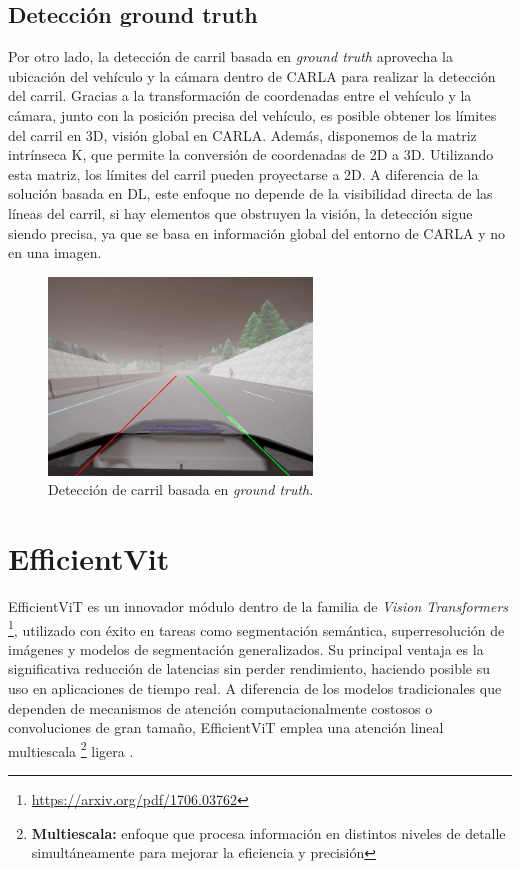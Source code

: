 \subsection{Detección ground truth}
\label{sec:gt}

Por otro lado, la detección de carril basada en \textit{ground truth} aprovecha la ubicación del vehículo y la cámara dentro de CARLA para realizar la detección del carril. Gracias a la transformación de coordenadas entre el vehículo y la cámara, junto con la posición precisa del vehículo, es posible obtener los límites del carril en 3D, visión global en CARLA. Además, disponemos de la matriz intrínseca K, que permite la conversión de coordenadas de 2D a 3D. Utilizando esta matriz, los límites del carril pueden proyectarse a 2D. A diferencia de la solución basada en \ac{DL}, este enfoque no depende de la visibilidad directa de las líneas del carril, si hay elementos que obstruyen la visión, la detección sigue siendo precisa, ya que se basa en información global del entorno de CARLA y no en una imagen.

\begin{figure}[ht]
  \begin{center}
    \includegraphics[width=7cm]{figs/Plataformas_Desarollo/ground_truth.png}
  \end{center}
  \caption{Detección de carril basada en \textit{ground truth}.}
  \label{dl_lane}
\end{figure}

\section{EfficientVit}
\label{sec:ef}

EfficientViT es un innovador módulo dentro de la familia de \textit{Vision Transformers} \footnote{\url{https://arxiv.org/pdf/1706.03762}}, utilizado con éxito en tareas como segmentación semántica, superresolución de imágenes y modelos de segmentación generalizados. Su principal ventaja es la significativa reducción de latencias sin perder rendimiento, haciendo posible su uso en aplicaciones de tiempo real. A diferencia de los modelos tradicionales que dependen de mecanismos de atención computacionalmente costosos o convoluciones de gran tamaño, EfficientViT emplea una atención lineal multiescala \footnote{\textbf{Multiescala:} enfoque que procesa información en distintos niveles de detalle simultáneamente para mejorar la eficiencia y precisión} ligera \cite{efficientvit}.

